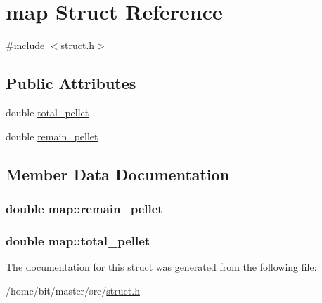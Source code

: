 \hypertarget{structmap}{\section{map Struct Reference}
\label{structmap}
}


{\ttfamily \#include $<$struct.\-h$>$}

\subsection*{Public Attributes}
\begin{DoxyCompactItemize}
\item 
double \hyperlink{structmap_a07f34ead2de5b0210854d98d4808fe89}{total\-\_\-pellet}
\item 
double \hyperlink{structmap_af1bf0e28cffb2b529a66e51620bc90b2}{remain\-\_\-pellet}
\end{DoxyCompactItemize}


\subsection{Member Data Documentation}
\hypertarget{structmap_af1bf0e28cffb2b529a66e51620bc90b2}{
\subsubsection[{remain\-\_\-pellet}]{\setlength{\rightskip}{0pt plus 5cm}double map\-::remain\-\_\-pellet}}\label{structmap_af1bf0e28cffb2b529a66e51620bc90b2}
\hypertarget{structmap_a07f34ead2de5b0210854d98d4808fe89}{
\subsubsection[{total\-\_\-pellet}]{\setlength{\rightskip}{0pt plus 5cm}double map\-::total\-\_\-pellet}}\label{structmap_a07f34ead2de5b0210854d98d4808fe89}


The documentation for this struct was generated from the following file\-:\begin{DoxyCompactItemize}
\item 
/home/bit/master/src/\hyperlink{struct_8h}{struct.\-h}\end{DoxyCompactItemize}

